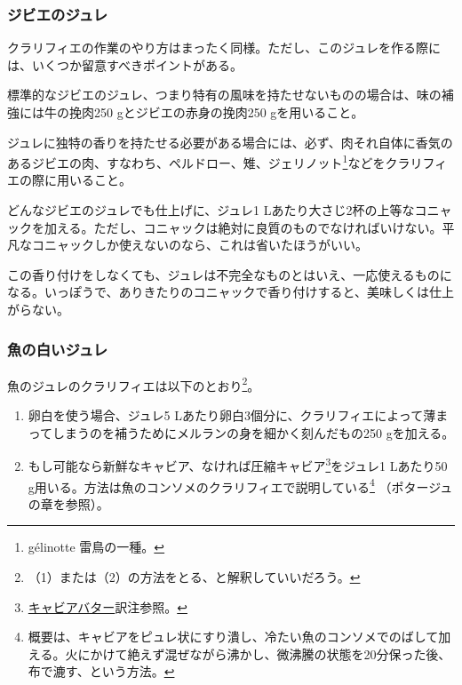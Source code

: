 \begin{recette}
\hypertarget{gelee-de-gibier}{%
\subsubsection{ジビエのジュレ}\label{gelee-de-gibier}}



クラリフィエの作業のやり方はまったく同様。ただし、このジュレを作る際には、いくつか留意すべきポイントがある。

標準的なジビエのジュレ、つまり特有の風味を持たせないものの場合は、味の補強には牛の挽肉250
gとジビエの赤身の挽肉250 gを用いること。

ジュレに独特の香りを持たせる必要がある場合には、必ず、肉それ自体に香気のあるジビエの肉、すなわち、ペルドロー、雉、ジェリノット\footnote{gélinotte
  雷鳥の一種。}などをクラリフィエの際に用いること。

どんなジビエのジュレでも仕上げに、ジュレ1
Lあたり大さじ2杯の上等なコニャックを加える。ただし、コニャックは絶対に良質のものでなければいけない。平凡なコニャックしか使えないのなら、これは省いたほうがいい。

この香り付けをしなくても、ジュレは不完全なものとはいえ、一応使えるものになる。いっぽうで、ありきたりのコニャックで香り付けすると、美味しくは仕上がらない。

\hypertarget{gelee-de-poisson-blanche}{%
\subsubsection{魚の白いジュレ}\label{gelee-de-poisson-blanche}}



魚のジュレのクラリフィエは以下のとおり\footnote{（1）または（2）の方法をとる、と解釈していいだろう。}。

\begin{enumerate}
\def\labelenumi{\arabic{enumi}.}
\item
  卵白を使う場合、ジュレ5
  Lあたり卵白3個分に、クラリフィエによって薄まってしまうのを補うためにメルランの身を細かく刻んだもの250
  gを加える。
\item
  もし可能なら新鮮なキャビア、なければ圧縮キャビア\footnote{\protect\hyperlink{beurre-de-caviar}{キャビアバター}訳注参照。}をジュレ1
  Lあたり50
  g用いる。方法は魚のコンソメのクラリフィエで説明している\footnote{概要は、キャビアをピュレ状にすり潰し、冷たい魚のコンソメでのばして加える。火にかけて絶えず混ぜながら沸かし、微沸騰の状態を20分保った後、布で漉す、という方法。}
  （ポタージュの章を参照）。
\end{enumerate}


\end{recette}
